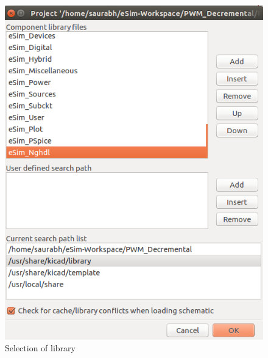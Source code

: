 \begin{enumerate}
        \begin{figure}[!htp]
            \centering
            \includegraphics[width =\smfig]{./NGHDL/screen7.png}
            \caption{Selection of library} %
            \label{screen7}
        \end{figure}



\end{enumerate}
